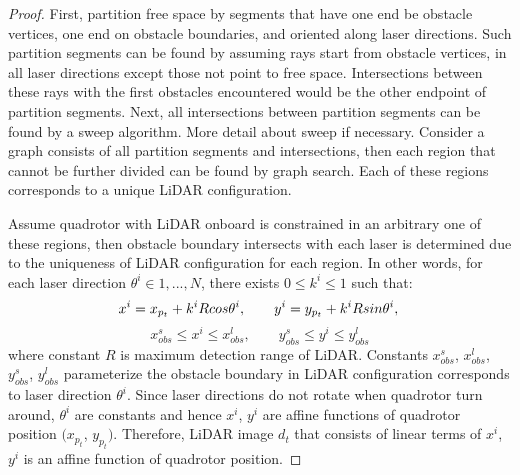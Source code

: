 \begin{proof}
    First, partition free space by segments that have one end be obstacle vertices, one end on obstacle boundaries, 
    and oriented along laser directions.
    Such partition segments can be found by assuming rays start from obstacle vertices,
    in all laser directions except those not point to free space.
    Intersections between these rays with the first obstacles encountered would be the other endpoint of partition segments.
    Next, all intersections between partition segments can be found by a sweep algorithm. 
    {\color{blue} More detail about sweep if necessary.}
    Consider a graph consists of all partition segments and intersections,
    then each region that cannot be further divided can be found by graph search.
    Each of these regions corresponds to a unique LiDAR configuration.
    
    Assume quadrotor with LiDAR onboard is constrained in an arbitrary one of these regions, 
    then obstacle boundary intersects with each laser is determined due to the uniqueness of LiDAR configuration for each region.
    In other words, for each laser direction $\theta^i \in {1, ..., N}$, there exists $0 \le k^i \le 1$ such that:
    \begin{equation}
        \label{eq: intersection1}
        x^i = x_{p_t} + k^i R cos\theta^i, \qquad y^i = y_{p_t} + k^i R sin\theta^i, \\
    \end{equation} 
    \begin{equation}
        \label{eq: intersection2}
        x_{obs}^s \le x^i \le x_{obs}^l, \qquad y_{obs}^s \le y^i \le y_{obs}^l
    \end{equation} 
    where constant $R$ is maximum detection range of LiDAR.
    Constants $x_{obs}^s$, $x_{obs}^l$, $y_{obs}^s$, $y_{obs}^l$ parameterize the obstacle boundary in LiDAR configuration corresponds
    to laser direction $\theta^i$.
    Since laser directions do not rotate when quadrotor turn around,  
    $\theta^i$ are constants and hence $x^i$, $y^i$ are affine functions of quadrotor position $(x_{p_t}$, $y_{p_t})$.
    Therefore, LiDAR image $d_t$ that consists of linear terms of $x^i$, $y^i$ is an affine function of quadrotor position.
\end{proof}

